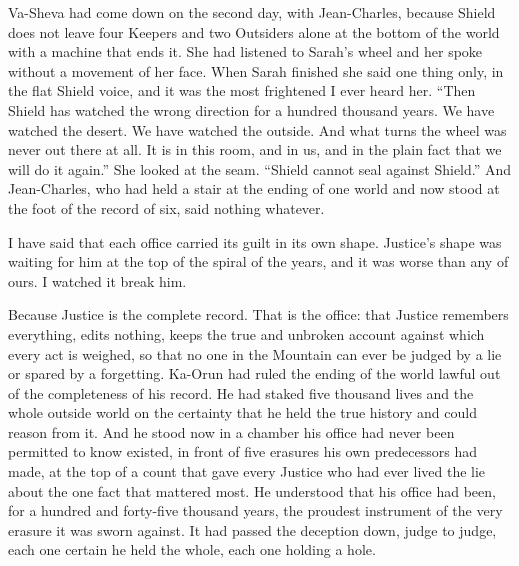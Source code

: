 Va-Sheva had come down on the second day, with Jean-Charles, because Shield does not leave four Keepers and two Outsiders alone at the bottom of the world with a machine that ends it. She had listened to Sarah's wheel and her spoke without a movement of her face. When Sarah finished she said one thing only, in the flat Shield voice, and it was the most frightened I ever heard her. ``Then Shield has watched the wrong direction for a hundred thousand years. We have watched the desert. We have watched the outside. And what turns the wheel was never out there at all. It is in this room, and in us, and in the plain fact that we will do it again.'' She looked at the seam. ``Shield cannot seal against Shield.'' And Jean-Charles, who had held a stair at the ending of one world and now stood at the foot of the record of six, said nothing whatever.\par

\ornament

I have said that each office carried its guilt in its own shape. Justice's shape was waiting for him at the top of the spiral of the years, and it was worse than any of ours. I watched it break him.\par

Because Justice is the complete record. That is the office: that Justice remembers everything, edits nothing, keeps the true and unbroken account against which every act is weighed, so that no one in the Mountain can ever be judged by a lie or spared by a forgetting. Ka-Orun had ruled the ending of the world lawful out of the completeness of his record. He had staked five thousand lives and the whole outside world on the certainty that he held the true history and could reason from it. And he stood now in a chamber his office had never been permitted to know existed, in front of five erasures his own predecessors had made, at the top of a count that gave every Justice who had ever lived the lie about the one fact that mattered most. He understood that his office had been, for a hundred and forty-five thousand years, the proudest instrument of the very erasure it was sworn against. It had passed the deception down, judge to judge, each one certain he held the whole, each one holding a hole.\par

